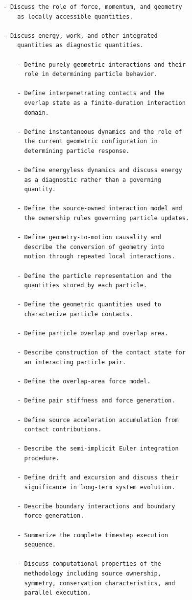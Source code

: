 \begin{verbatim}
	- Discuss the role of force, momentum, and geometry
  		as locally accessible quantities.

	- Discuss energy, work, and other integrated
  		quantities as diagnostic quantities.

        - Define purely geometric interactions and their
          role in determining particle behavior.

        - Define interpenetrating contacts and the
          overlap state as a finite-duration interaction
          domain.

        - Define instantaneous dynamics and the role of
          the current geometric configuration in
          determining particle response.

        - Define energyless dynamics and discuss energy
          as a diagnostic rather than a governing
          quantity.

        - Define the source-owned interaction model and
          the ownership rules governing particle updates.

        - Define geometry-to-motion causality and
          describe the conversion of geometry into
          motion through repeated local interactions.

        - Define the particle representation and the
          quantities stored by each particle.

        - Define the geometric quantities used to
          characterize particle contacts.

        - Define particle overlap and overlap area.

        - Describe construction of the contact state for
          an interacting particle pair.

        - Define the overlap-area force model.

        - Define pair stiffness and force generation.

        - Define source acceleration accumulation from
          contact contributions.

        - Describe the semi-implicit Euler integration
          procedure.

        - Define drift and excursion and discuss their
          significance in long-term system evolution.

        - Describe boundary interactions and boundary
          force generation.

        - Summarize the complete timestep execution
          sequence.

        - Discuss computational properties of the
          methodology including source ownership,
          symmetry, conservation characteristics, and
          parallel execution.


\end{verbatim}
